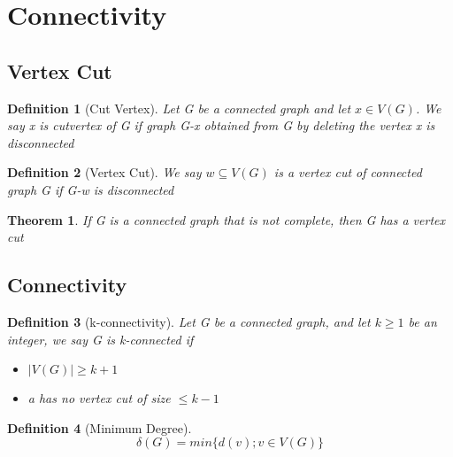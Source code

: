 \documentclass[10pt]{article}
\theoremstyle{break}
\newtheorem{thm}{Theorem}[subsection]
\newtheorem{defn}{Definition}[subsection]
\begin{document}
\section{Connectivity}
\subsection{Vertex Cut}
\begin{defn}[Cut Vertex]
Let G be a connected graph and let $x \in V(G)$. We say x is cutvertex of G if graph G-x obtained from G by deleting the vertex x is disconnected
\end{defn}

\begin{defn}[Vertex Cut]
We say $w \subseteq V(G)$ is a vertex cut of connected graph G if G-w is disconnected
\end{defn}

\begin{thm}
If G is a connected graph that is not complete, then G has a vertex cut
\end{thm}
\subsection{Connectivity}
\begin{defn}[k-connectivity]
Let G be a connected graph, and let $k \geq 1$ be an integer, we say G is k-connected if
\begin{itemize}
\item $|V(G)| \geq k+1$
\item a has no vertex cut of size $\leq k-1$ 
\end{itemize}
\end{defn}

\begin{defn}[Minimum Degree]
$$\delta(G)=min \{d(v); v \in V(G)\}$$
\end{defn}
\end{document}
